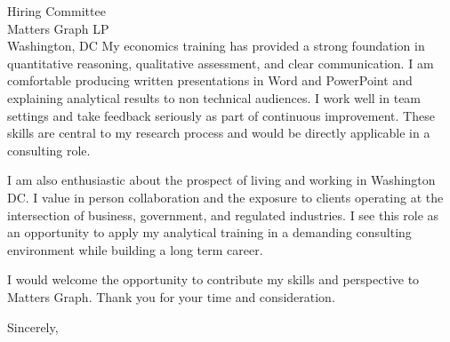 \documentclass[11pt]{letter}
\begin{document}
\begin{letter}{Hiring Committee \\ Matters Graph LP \\ Washington, DC}
My economics training has provided a strong foundation in quantitative reasoning, qualitative assessment, and clear communication. I am comfortable producing written presentations in Word and PowerPoint and explaining analytical results to non technical audiences. I work well in team settings and take feedback seriously as part of continuous improvement. These skills are central to my research process and would be directly applicable in a consulting role.

I am also enthusiastic about the prospect of living and working in Washington DC. I value in person collaboration and the exposure to clients operating at the intersection of business, government, and regulated industries. I see this role as an opportunity to apply my analytical training in a demanding consulting environment while building a long term career.

I would welcome the opportunity to contribute my skills and perspective to Matters Graph. Thank you for your time and consideration.

\closing{Sincerely,}

\end{letter}
\end{document}
